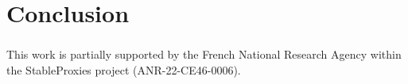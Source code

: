 \documentclass[runningheads]{llncs}
\begin{document}


    \section{Conclusion}


    \begin{credits}
        \subsubsection{\ackname}
        This work is partially supported by the French National Research Agency
        within the StableProxies project (ANR-22-CE46-0006).
    \end{credits}
%
%
%
    
    
\end{document}
